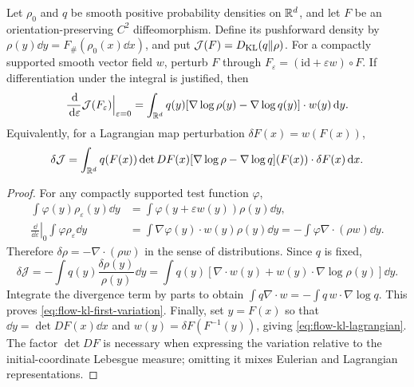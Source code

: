 \documentclass[12pt,a4paper,oneside]{book}
\begin{document}
\begin{theorem}
\label{thm:flow-kl-variation}\label{src:p9q13}
Let $\rho_0$ and $q$ be smooth positive probability densities on
$\mathbb{R}^d$, and let $F$ be an orientation-preserving $C^2$
diffeomorphism. Define its pushforward density by
$\rho(y)\dd y=F_\#(\rho_0(x)\dd x)$, and put
$\mathcal J(F)=D_{\mathrm{KL}}(q\Vert\rho)$. For a compactly supported smooth
vector field $w$, perturb $F$ through
$F_\varepsilon=(\mathrm{id}+\varepsilon w)\circ F$.
If differentiation under the integral is justified, then
\begin{equation}
\frac{\,\mathrm{d}}{\,\mathrm{d}\varepsilon}\mathcal J(F_\varepsilon)
\Big|_{\varepsilon=0}
=\int_{\mathbb{R}^d}q(y)
[\nabla\log\rho(y)-\nabla\log q(y)]\cdot w(y)\,\mathrm{d} y.
\label{eq:flow-kl-first-variation}
\end{equation}
Equivalently, for a Lagrangian map perturbation
$\delta F(x)=w(F(x))$,
\begin{equation}
\delta\mathcal J
=\int_{\mathbb{R}^d}q(F(x))\det DF(x)
[\nabla\log\rho-\nabla\log q](F(x))
\cdot\delta F(x)\,\mathrm{d} x.
\label{eq:flow-kl-lagrangian}
\end{equation}
\end{theorem}
\begin{proof}
For any compactly supported test function $\varphi$,
\begin{equation*}
\begin{aligned}
\int\varphi(y)\rho_\varepsilon(y)\dd y
&=\int\varphi(y+\varepsilon w(y))\rho(y)\dd y,\\
\left.\frac{\dd}{\dd\varepsilon}\right|_0
\int\varphi\rho_\varepsilon\dd y
&=\int\nabla\varphi(y)\cdot w(y)\rho(y)\dd y
=-\int\varphi\nabla\cdot(\rho w)\dd y.
\end{aligned}
\end{equation*}
Therefore $\delta\rho=-\nabla\cdot(\rho w)$ in the
sense of distributions. Since $q$ is fixed,
\begin{equation*}
\delta\mathcal J
=-\int q(y)\frac{\delta\rho(y)}{\rho(y)}\dd y
=\int q(y)\left[\nabla\cdot w(y)
+w(y)\cdot\nabla\log\rho(y)\right]\dd y.
\end{equation*}
Integrate the divergence term by parts to obtain
$\int q\nabla\cdot w=-\int q\,w\cdot\nabla\log q$.
This proves \eqref{eq:flow-kl-first-variation}.
Finally, set $y=F(x)$ so that
$\dd y=\det DF(x)\dd x$ and
$w(y)=\delta F(F^{-1}(y))$, giving
\eqref{eq:flow-kl-lagrangian}. The factor $\det DF$ is necessary
when expressing the variation relative to the initial-coordinate
Lebesgue measure; omitting it mixes Eulerian and Lagrangian
representations.
\end{proof}
\end{document}
